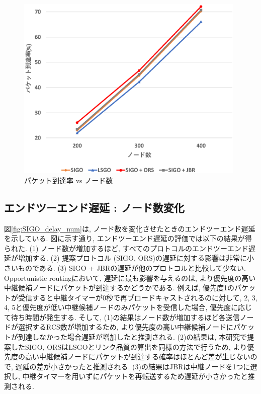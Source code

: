 \documentclass[10pt]{jreport}
\begin{document}
\begin{figure}[!ht]
	\centering
	\includegraphics[width=110mm]{figures/SIGO_PDR_num.eps}
	\caption{パケット到達率 vs ノード数}
	\label{fig:SIGO_PDR_num}
\end{figure}

\subsection{エンドツーエンド遅延 : ノード数変化}
図\ref{fig:SIGO_delay_num}は, ノード数を変化させたときのエンドツーエンド遅延を示している.
図に示す通り, エンドツーエンド遅延の評価では以下の結果が得られた.
(1) ノード数が増加するほど, すべてのプロトコルのエンドツーエンド遅延が増加する.
(2) 提案プロトコル (SIGO, ORS)の遅延に対する影響は非常に小さいものである. 
(3) SIGO + JBRの遅延が他のプロトコルと比較して少ない. 
Opportunistic routingにおいて, 遅延に最も影響を与えるのは, より優先度の高い中継候補ノードにパケットが到達するかどうかである. 例えば, 優先度1のパケットが受信すると中継タイマーが0秒で再ブロードキャストされるのに対して, 2, 3, 4, 5と優先度が低い中継候補ノードのみパケットを受信した場合, 優先度に応じて待ち時間が発生する.
そして, (1)の結果はノード数が増加するほど各送信ノードが選択するRCS数が増加するため, より優先度の高い中継候補ノードにパケットが到達しなかった場合遅延が増加したと推測される. 
(2)の結果は, 本研究で提案したSIGO, ORSはLSGOとリンク品質の算出を同様の方法で行うため, より優先度の高い中継候補ノードにパケットが到達する確率はほとんど差が生じないので, 遅延の差が小さかったと推測される. 
(3)の結果はJBRは中継ノードを1つに選択し, 中継タイマーを用いずにパケットを再転送するため遅延が小さかったと推測される. 
\end{document}
